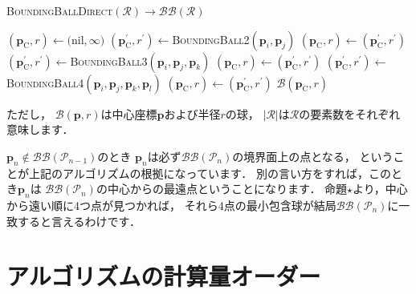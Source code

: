 ﻿\documentclass[a4paper]{jsarticle}
\begin{document}
\begin{algorithm}[h]
\caption{\textsc{BoundingBallDirect}$(\mathcal{R})\rightarrow\mathcal{BB}(\mathcal{R})$}
\begin{algorithmic}[1]
\State $(\boldsymbol{p}_{\mathrm{C}},r)\leftarrow($nil$,\infty)$
  \State $(\boldsymbol{p}_{\mathrm{C}}^{\prime},r^{\prime})\leftarrow$\textsc{BoundingBall2}$(\boldsymbol{p}_{i},\boldsymbol{p}_{j})$
    \State $(\boldsymbol{p}_{\mathrm{C}},r)\leftarrow(\boldsymbol{p}_{\mathrm{C}}^{\prime},r^{\prime})$
  \EndIf
\EndFor
{}
    \State $(\boldsymbol{p}_{\mathrm{C}}^{\prime},r^{\prime})\leftarrow$\textsc{BoundingBall3}$(\boldsymbol{p}_{i},\boldsymbol{p}_{j},\boldsymbol{p}_{k})$
      \State $(\boldsymbol{p}_{\mathrm{C}},r)\leftarrow(\boldsymbol{p}_{\mathrm{C}}^{\prime},r^{\prime})$
    \EndIf
  \EndFor
\EndIf
{}
    \State $(\boldsymbol{p}_{\mathrm{C}}^{\prime},r^{\prime})\leftarrow$\textsc{BoundingBall4}$(\boldsymbol{p}_{i},\boldsymbol{p}_{j},\boldsymbol{p}_{k},\boldsymbol{p}_{l})$
      \State $(\boldsymbol{p}_{\mathrm{C}},r)\leftarrow(\boldsymbol{p}_{\mathrm{C}}^{\prime},r^{\prime})$
    \EndIf
  \EndFor
\EndIf
{} $\mathcal{B}(\boldsymbol{p}_{\mathrm{C}},r)$
\end{algorithmic}
\end{algorithm}

ただし，
$\mathcal{B}(\boldsymbol{p},r)$は中心座標$\boldsymbol{p}$および半径$r$の球，
$\left|\mathcal{R}\right|$は$\mathcal{R}$の要素数をそれぞれ意味します．

$\boldsymbol{p}_{n}\notin\mathcal{BB}(\mathcal{P}_{n-1})$のとき
$\boldsymbol{p}_{n}$は必ず$\mathcal{BB}(\mathcal{P}_{n})$の境界面上の点となる，
ということが上記のアルゴリズムの根拠になっています．
別の言い方をすれば，このとき$\boldsymbol{p}_{n}$は
$\mathcal{BB}(\mathcal{P}_{n})$の中心からの最遠点ということになります．
命題$\star$より，中心から遠い順に4つ点が見つかれば，
それら4点の最小包含球が結局$\mathcal{BB}(\mathcal{P}_{n})$に一致すると言えるわけです．


\section{アルゴリズムの計算量オーダー}
\end{document}
